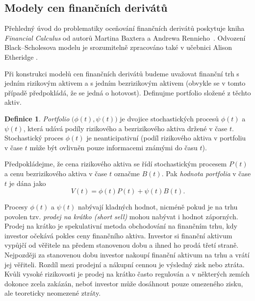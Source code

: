 \documentclass[a4paper,12pt]{report}
\theoremstyle{definition} \newtheorem{definice}[veta]{Definice}
\theoremstyle{remark}
\begin{document}
\subsection{Modely cen finančních derivátů}
Přehledný úvod do problematiky oceňování finančních derivátů poskytuje kniha \textit{Financial Calculus} od autorů Martina Baxtera a Andrewa Rennieho~\cite{baxter1996financial}.
Odvození Black–Scholesova modelu je srozumitelně zpracováno také v učebnici Alison Etheridge \cite{etheridge2002course}.

Při konstrukci modelů cen finančních derivátů budeme uvažovat finanční trh s jedním rizikovým aktivem a s jedním bezrizikovým aktivem (obvykle se v tomto případě předpokládá, že se jedná o hotovost).
Definujme portfolio složené z těchto aktiv.
\begin{definice}
\textit{Portfolio} $\big(\phi(t),\psi(t)\big)$ je dvojice stochastických procesů $\phi(t)$ a $\psi(t)$, která udává podíly rizikového a bezrizikového aktiva držené v čase $t$.
Stochastický proces $\phi(t)$ je neanticipativní (podíl rizikového aktiva v portfoliu v čase $t$ může být ovlivněn pouze informacemi známými do času $t$).

Předpokládejme, že cena rizikového aktiva se řídí stochastickým procesem $P(t)$ a cenu bezrizikového aktiva v čase $t$ označme $B(t)$.
Pak \textit{hodnota portfolia} v čase $t$ je dána jako
\begin{equation}\label{hodnota_portfolia}
V(t)=\phi(t)P(t)+\psi(t)B(t).
\end{equation}
\end{definice}

Procesy $\phi(t)$ a $\psi(t)$ nabývají kladných hodnot, nicméně pokud je na trhu povolen tzv. \textit{prodej na krátko (short sell)} mohou nabývat i hodnot záporných.
Prodej na krátko je spekulativní metoda obchodování na finančním trhu, kdy investor očekává pokles ceny finančního aktiva.
Investor si finanční aktivum vypůjčí od věřitele na předem stanovenou dobu a ihned ho prodá třetí straně.
Nejpozději za stanovenou dobu investor nakoupí finanční aktivum na trhu a vrátí jej věřiteli.
Rozdíl mezi prodejní a nákupní cennou je výsledný zisk nebo ztráta.
Kvůli vysoké rizikovosti je prodej na krátko často regulován a v některých zemích dokonce zcela zakázán, neboť investor může dosáhnout pouze omezeného zisku, ale teoreticky neomezené ztráty.
\end{document}
